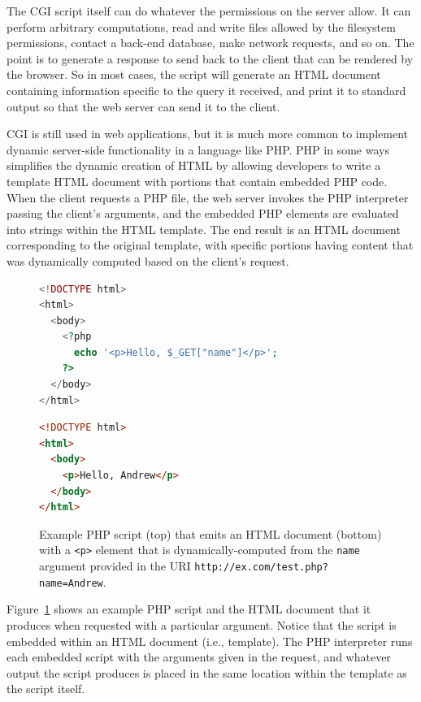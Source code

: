 \documentclass[11pt,twoside]{scrartcl}
\begin{document}
The CGI script itself can do whatever the permissions on the server allow. It can perform arbitrary computations, read and write files allowed by the filesystem permissions, contact a back-end database, make network requests, and so on. The point is to generate a response to send back to the client that can be rendered by the browser. So in most cases, the script will generate an HTML document containing information specific to the query it received, and print it to standard output so that the web server can send it to the client.

CGI is still used in web applications, but it is much more common to implement dynamic server-side functionality in a language like PHP. PHP in some ways simplifies the dynamic creation of HTML by allowing developers to write a template HTML document with portions that contain embedded PHP code. When the client requests a PHP file, the web server invokes the PHP interpreter passing the client's arguments, and the embedded PHP elements are evaluated into strings within the HTML template. The end result is an HTML document corresponding to the original template, with specific portions having content that was dynamically computed based on the client's request.

\begin{figure}
\begin{lstlisting}[language=PHP]
<!DOCTYPE html>
<html>
  <body>
    <?php 
      echo '<p>Hello, $_GET["name"]</p>'; 
    ?>
  </body>
</html>
\end{lstlisting}

\begin{lstlisting}[language=HTML]
<!DOCTYPE html>
<html>
  <body>
    <p>Hello, Andrew</p>
  </body>
</html>
\end{lstlisting}

\caption{\label{fig:php} Example PHP script (top) that emits an HTML document (bottom) with a \texttt{<p>} element that is dynamically-computed from the \texttt{name} argument provided in the URI \nolinkurl{http://ex.com/test.php?name=Andrew}.}
\end{figure}

Figure~\ref{fig:php} shows an example PHP script and the HTML document that it produces when requested with a particular argument. Notice that the script is embedded within an HTML document (i.e., template). The PHP interpreter runs each embedded script with the arguments given in the request, and whatever output the script produces is placed in the same location within the template as the script itself.


\end{document}
